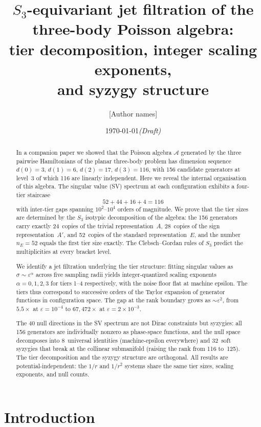 \documentclass[11pt,a4paper]{article}
\title{$S_3$-equivariant jet filtration of the\\
three-body Poisson algebra:\\
tier decomposition, integer scaling exponents,\\
and syzygy structure}
\author{[Author names]}
\date{\today \quad \textit{(Draft)}}
\theoremstyle{remark}
\newcommand{\cA}{\mathcal{A}}
\newcommand{\SG}{S_3}
\begin{document}
\maketitle

\begin{abstract}
In a companion paper we showed that the Poisson algebra
$\cA$ generated by the three pairwise Hamiltonians of the
planar three-body problem has dimension sequence
$d(0)=3$, $d(1)=6$, $d(2)=17$, $d(3)=116$,
with 156 candidate generators at level~3 of which 116
are linearly independent.  Here we reveal the internal
organisation of this algebra.  The singular value (SV)
spectrum at each configuration exhibits a four-tier
staircase
\[
  52 + 44 + 16 + 4 = 116
\]
with inter-tier gaps spanning $10^{2}$--$10^{4}$ orders
of magnitude.  We prove that the tier sizes are determined
by the $\SG$ isotypic decomposition of the algebra:
the 156 generators carry exactly 24~copies of the
trivial representation~$A$, 28~copies of the sign
representation~$A'$, and 52~copies of the standard
representation~$E$, and the number $n_E = 52$ equals
the first tier size exactly.  The Clebsch--Gordan rules
of $\SG$ predict the multiplicities at every bracket level.

We identify a jet filtration underlying the tier
structure: fitting singular values as $\sigma \sim
\varepsilon^\alpha$ across five sampling radii yields
integer-quantized scaling exponents
$\alpha = 0, 1, 2, 3$ for tiers 1--4 respectively,
with the noise floor flat at machine epsilon.
The tiers thus correspond to successive orders of the
Taylor expansion of generator functions in configuration
space.  The gap at the rank boundary grows as
$\sim\!\varepsilon^2$, from $5.5\times$ at
$\varepsilon=10^{-4}$ to $67{,}472\times$ at
$\varepsilon=2\times 10^{-3}$.

The 40 null directions in the SV spectrum are not
Dirac constraints but syzygies: all 156 generators are
individually nonzero as phase-space functions, and the
null space decomposes into 8~universal identities
(machine-epsilon everywhere) and 32~soft syzygies
that break at the collinear submanifold (raising the
rank from 116 to~125).  The tier decomposition and the
syzygy structure are orthogonal.  All results are
potential-independent: the $1/r$ and $1/r^2$ systems
share the same tier sizes, scaling exponents, and null
counts.
\end{abstract}


\section{Introduction}
\end{document}
